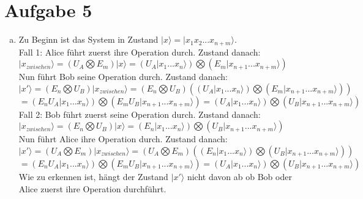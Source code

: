 \documentclass[a4paper]{scrartcl}
\begin{document}
\section*{Aufgabe 5}
\begin{enumerate}[a)]

\item Zu Beginn ist das System in Zustand $|x\rangle =|x_1x_2...x_{n+m}\rangle$. \\
Fall 1: Alice führt zuerst ihre Operation durch. Zustand danach:\\
$|x_{zwischen}\rangle=(U_A\bigotimes E_{m})|x\rangle = (U_A|x_1...x_n\rangle)\bigotimes (E_{m}|x_{n+1}...x_{n+m}\rangle)$\\
Nun führt Bob seine Operation durch. Zustand danach:\\
$|x'\rangle = (E_n\bigotimes U_B)|x_{zwischen}\rangle= (E_n\bigotimes U_B) ((U_A|x_1...x_n\rangle)\bigotimes (E_{m}|x_{n+1}...x_{n+m}\rangle))$\\
$= (E_nU_A|x_1...x_n\rangle)\bigotimes (E_mU_B|x_{n+1}...x_{n+m}\rangle)=(U_A|x_1...x_n\rangle)\bigotimes (U_B|x_{n+1}...x_{n+m}\rangle) $\\

\noindent Fall 2: Bob führt zuerst seine Operation durch. Zustand danach:\\
$|x_{zwischen}\rangle=(E_n \bigotimes U_B)|x\rangle = (E_n|x_1...x_n\rangle)\bigotimes (U_B|x_{n+1}...x_{n+m}\rangle)$\\
Nun führt Alice ihre Operation durch. Zustand danach:\\
$|x'\rangle = (U_A\bigotimes E_m)|x_{zwischen}\rangle= (U_A\bigotimes E_m) ((E_n|x_1...x_n\rangle)\bigotimes (U_B|x_{n+1}...x_{n+m}\rangle))$\\
$= (E_nU_A|x_1...x_n\rangle)\bigotimes (E_mU_B|x_{n+1}...x_{n+m}\rangle)=(U_A|x_1...x_n\rangle)\bigotimes (U_B|x_{n+1}...x_{n+m}\rangle)$\\
Wie zu erkennen ist, hängt der Zustand $|x'\rangle$ nicht davon ab ob Bob oder Alice zuerst ihre Operation durchführt.
\end{enumerate}
\end{document}
